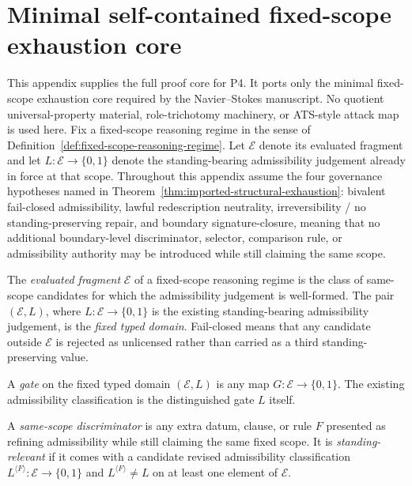 \clearpage
\section{Minimal self-contained fixed-scope exhaustion core}

This appendix supplies the full proof core for P4. It ports only the minimal fixed-scope exhaustion core required by the Navier--Stokes manuscript. No quotient universal-property material, role-trichotomy machinery, or ATS-style attack map is used here. Fix a fixed-scope reasoning regime in the sense of Definition~\ref{def:fixed-scope-reasoning-regime}. Let $\mathcal E$ denote its evaluated fragment and let $L:\mathcal E\to\{0,1\}$ denote the standing-bearing admissibility judgement already in force at that scope. Throughout this appendix assume the four governance hypotheses named in Theorem~\ref{thm:imported-structural-exhaustion}: bivalent fail-closed admissibility, lawful redescription neutrality, irreversibility / no standing-preserving repair, and boundary signature-closure, meaning that no additional boundary-level discriminator, selector, comparison rule, or admissibility authority may be introduced while still claiming the same scope.

\begin{manualdefinition}
\label{def:p4-evaluated-fragment}
The \emph{evaluated fragment} $\mathcal E$ of a fixed-scope reasoning regime is the class of same-scope candidates for which the admissibility judgement is well-formed. The pair $(\mathcal E,L)$, where $L:\mathcal E\to\{0,1\}$ is the existing standing-bearing admissibility judgement, is the \emph{fixed typed domain}. Fail-closed means that any candidate outside $\mathcal E$ is rejected as unlicensed rather than carried as a third standing-preserving value.
\end{manualdefinition}

\begin{manualdefinition}
\label{def:p4-gate}
A \emph{gate} on the fixed typed domain $(\mathcal E,L)$ is any map $G:\mathcal E\to\{0,1\}$. The existing admissibility classification is the distinguished gate $L$ itself.
\end{manualdefinition}

\begin{manualdefinition}
\label{def:p4-standing-relevant-discriminator}
A \emph{same-scope discriminator} is any extra datum, clause, or rule $F$ presented as refining admissibility while still claiming the same fixed scope. It is \emph{standing-relevant} if it comes with a candidate revised admissibility classification $L^{\langle F\rangle}:\mathcal E\to\{0,1\}$ and $L^{\langle F\rangle}\neq L$ on at least one element of $\mathcal E$.
\end{manualdefinition}

